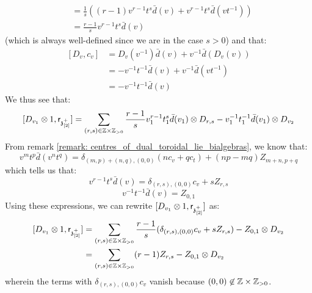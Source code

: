 \begin{remark}
\begin{enumerate}
\begin{enumerate}
\begin{enumerate}
$$\begin{aligned}
                                        & = \frac1s \left( (r - 1) v^{r - 1} t^s \bar{d}(v) + v^{r - 1} t^s \bar{d}(v t^{-1}) \right)
                                        \\
                                        & = \frac{r - 1}{s} v^{r - 1} t^s \bar{d}(v) 
                                    \end{aligned}
                                $$
                            (which is always well-defined since we are in the case $s > 0$) and that:
                                $$
                                    \begin{aligned}
                                        [D_v, c_v] & = D_v(v^{-1}) \bar{d}(v) + v^{-1} \bar{d}(D_v(v))
                                        \\
                                        & = -v^{-1} t^{-1} \bar{d}(v) + v^{-1} \bar{d}(v t^{-1})
                                        \\
                                        & = -v^{-1} t^{-1} \bar{d}(v)
                                    \end{aligned}
                                $$
                            We thus see that:
                                $$[D_{v_1} \tensor 1, \sfr_{\z_{[2]}^+}] = \sum_{(r, s) \in \Z \x \Z_{> 0}} \frac{r - 1}{s} v_1^{r - 1} t_1^s \bar{d}(v_1)  \tensor D_{r, s} - v_1^{-1} t_1^{-1} \bar{d}(v_1) \tensor D_{v_2}$$
                            From remark \ref{remark: centres_of_dual_toroidal_lie_bialgebras}, we know that:
                                $$v^m t^p \bar{d}(v^n t^q) = \delta_{(m, p) + (n, q), (0, 0)} ( n c_v + q c_t ) + (np - mq) Z_{m + n, p + q}$$
                            which tells us that:
                                $$v^{r - 1} t^s \bar{d}(v) = \delta_{(r, s), (0, 0)} c_v + s Z_{r, s}$$
                                $$v^{-1} t^{-1} \bar{d}(v) = Z_{0, 1}$$
                            Using these expressions, we can rewrite $[D_{v_1} \tensor 1, \sfr_{\z_{[2]}^+}]$ as:
                                $$
                                    \begin{aligned}
                                        [D_{v_1} \tensor 1, \sfr_{\z_{[2]}^+}] & = \sum_{(r, s) \in \Z \x \Z_{> 0}} \frac{r - 1}{s} ( \delta_{(r, s), (0, 0)} c_v + s Z_{r, s} ) - Z_{0, 1} \tensor D_{v_2}
                                        \\
                                        & = \sum_{(r, s) \in \Z \x \Z_{> 0}} (r - 1) Z_{r, s} - Z_{0, 1} \tensor D_{v_2}
                                    \end{aligned}
                                $$
                            wherein the terms with $\delta_{(r, s), (0, 0)} c_v$ vanish because $(0, 0) \not \in \Z \x \Z_{> 0}$. 
 

\end{enumerate}
\end{enumerate}
\end{enumerate}
\end{remark}
